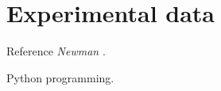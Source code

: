 \chapter{Experimental data}
\label{chap:expe}

Reference \textsl{Newman} \cite{newman2018networks}.

Python programming.